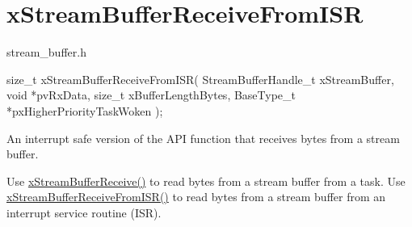 \hypertarget{group__xStreamBufferReceiveFromISR}{}\section{x\+Stream\+Buffer\+Receive\+From\+I\+SR}
\label{group__xStreamBufferReceiveFromISR}
stream\+\_\+buffer.\+h


\begin{DoxyPre}
size\_t xStreamBufferReceiveFromISR( StreamBufferHandle\_t xStreamBuffer,
                                    void *pvRxData,
                                    size\_t xBufferLengthBytes,
                                    BaseType\_t *pxHigherPriorityTaskWoken );
\end{DoxyPre}


An interrupt safe version of the A\+PI function that receives bytes from a stream buffer.

Use \hyperlink{stream__buffer_8h_a55efc144b988598d84a6087d3e20b507}{x\+Stream\+Buffer\+Receive()} to read bytes from a stream buffer from a task. Use \hyperlink{stream__buffer_8h_a6c882a1d9f26c40f93f271bd1b844b3b}{x\+Stream\+Buffer\+Receive\+From\+I\+S\+R()} to read bytes from a stream buffer from an interrupt service routine (I\+SR).


